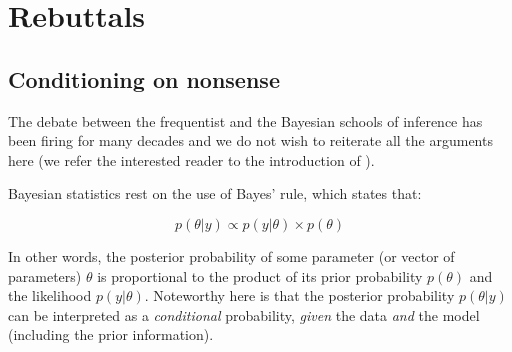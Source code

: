 \documentclass[a4paper,man,natbib,floatsintext,donotrepeattitle]{apa6}
\begin{document}
\section{Rebuttals}





\subsection{Conditioning on nonsense}

The debate between the frequentist and the Bayesian schools of inference has been firing for many decades and we do not wish to reiterate all the arguments here (we refer the interested reader to the introduction of \citealp{albers_credible_2018}).

Bayesian statistics rest on the use of Bayes' rule, which states that:

$$ p(\theta|y) \propto p(y|\theta) \times p(\theta) $$

In other words, the posterior probability of some parameter (or vector of parameters) $\theta$ is proportional to the product of its prior probability $p(\theta)$ and the likelihood $p(y|\theta)$. Noteworthy here is that the posterior probability $p(\theta|y)$ can be interpreted as a \textit{conditional} probability, \textit{given} the data \textit{and} the model (including the prior information).
\end{document}
